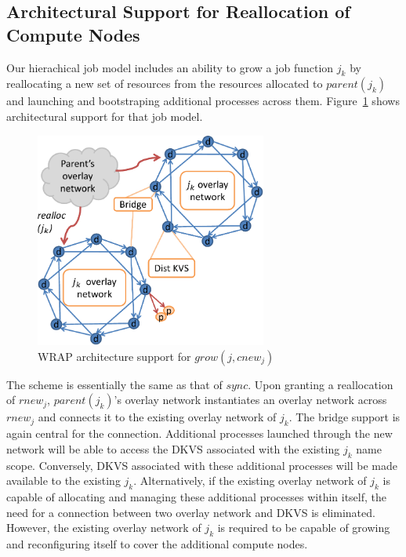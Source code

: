 \documentclass[10pt]{article}
\begin{document}
\subsection{Architectural Support for Reallocation of Compute Nodes} 
Our hierachical job model includes an ability to grow a job function $j_k$ 
by reallocating a new set of resources from the resources allocated
to $parent(j_k)$ and launching and bootstraping additional processes 
across them.
Figure~\ref{fig:ext2} shows architectural support for that
job model. 
\begin{figure}
  \centering
    \includegraphics[width=3.0in]{fig/WRAP_grow}
  \caption{WRAP architecture support for ${grow(j, cnew_j)}$}
  \label{fig:ext2}
\end{figure}
The scheme is essentially the same as that of $sync$. 
Upon granting a reallocation of $rnew_j$, 
$parent(j_k)$'s overlay network instantiates an overlay network
across $rnew_j$ and connects it to the existing overlay network
of $j_k$. The bridge support is again central for the connection. 
Additional processes launched through the new network will 
be able to access the DKVS associated with the existing $j_k$ 
name scope. Conversely, DKVS associated with these additional 
processes will be made available to the existing $j_k$. 
Alternatively, if the existing overlay network of $j_k$ is
capable of allocating and managing these additional processes
within itself, the need for a connection between two overlay
network and DKVS is eliminated. However, the existing overlay network
of $j_k$ is required to be capable of growing and 
reconfiguring itself to cover the additional compute nodes.
\end{document}
